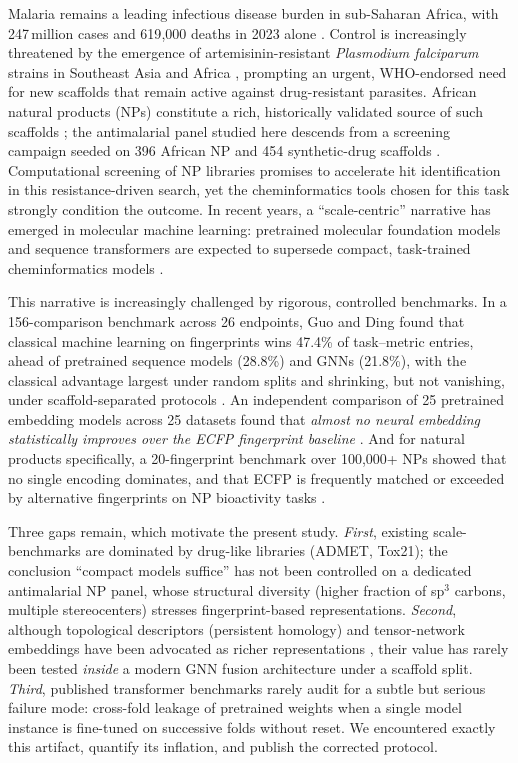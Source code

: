 \documentclass[11pt,a4paper]{article}
\begin{document}
Malaria remains a leading infectious disease burden in sub-Saharan Africa, with 247\,million cases and 619{,}000 deaths in 2023 alone \citep{who2024malariareport}. Control is increasingly threatened by the emergence of artemisinin-resistant \emph{Plasmodium falciparum} strains in Southeast Asia and Africa \citep{ariyey2014,ashley2018}, prompting an urgent, WHO-endorsed need for new scaffolds that remain active against drug-resistant parasites. African natural products (NPs) constitute a rich, historically validated source of such scaffolds \citep{anpdb_2026,value_addition_african_np_2025}; the antimalarial panel studied here descends from a screening campaign seeded on 396 African NP and 454 synthetic-drug scaffolds \citep{temgoua2026antimalarial}. Computational screening of NP libraries promises to accelerate hit identification in this resistance-driven search, yet the cheminformatics tools chosen for this task strongly condition the outcome. In recent years, a ``scale-centric'' narrative has emerged in molecular machine learning: pretrained molecular foundation models and sequence transformers are expected to supersede compact, task-trained cheminformatics models \citep{mol_tdl_2026,tn_efficient_2026}.

This narrative is increasingly challenged by rigorous, controlled benchmarks. In a 156-comparison benchmark across 26 endpoints, Guo and Ding found that classical machine learning on fingerprints wins 47.4\% of task--metric entries, ahead of pretrained sequence models (28.8\%) and GNNs (21.8\%), with the classical advantage largest under random splits and shrinking, but not vanishing, under scaffold-separated protocols \citep{guo_ding_2026}. An independent comparison of 25 pretrained embedding models across 25 datasets found that \emph{almost no neural embedding statistically improves over the ECFP fingerprint baseline} \citep{benchmark_pretrained_2025}. And for natural products specifically, a 20-fingerprint benchmark over 100,000+ NPs showed that no single encoding dominates, and that ECFP is frequently matched or exceeded by alternative fingerprints on NP bioactivity tasks \citep{boldini2024}.

Three gaps remain, which motivate the present study. \emph{First}, existing scale-benchmarks are dominated by drug-like libraries (ADMET, Tox21); the conclusion ``compact models suffice'' has not been controlled on a dedicated antimalarial NP panel, whose structural diversity (higher fraction of sp$^3$ carbons, multiple stereocenters) stresses fingerprint-based representations. \emph{Second}, although topological descriptors (persistent homology) and tensor-network embeddings have been advocated as richer representations \citep{tda_review_2025,topology_molecular_representations_2025,tn_efficient_2026}, their value has rarely been tested \emph{inside} a modern GNN fusion architecture under a scaffold split. \emph{Third}, published transformer benchmarks rarely audit for a subtle but serious failure mode: cross-fold leakage of pretrained weights when a single model instance is fine-tuned on successive folds without reset. We encountered exactly this artifact, quantify its inflation, and publish the corrected protocol.
\end{document}
